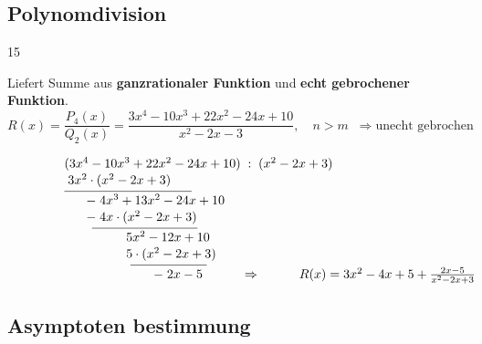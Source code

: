 \subsection{Polynomdivision }{15}

Liefert Summe aus \textbf{ganzrationaler Funktion} und \textbf{echt gebrochener Funktion}.
\[
R(x) = \frac{P_4(x)}{Q_2(x)} = \frac{3x^4 - 10x^3 + 22x^2 - 24x + 10}{x^2 - 2x - 3}, \quad n > m \;\; \Rightarrow \text{unecht gebrochen}
\]

\[
\makebox[270pt][l]{%
\begin{tabular}{@{}l@{}}
$(3x^4 - 10x^3 + 22x^2 - 24x + 10) \; : \; (x^2 - 2x + 3)$ \\[1pt]

$\;3x^2 \cdot (x^2 - 2x + 3)$ \\[-6pt]
\rule{3.5cm}{0.4pt} \\[-2pt]

\hspace*{0.6cm}$-\;4x^3 + 13x^2 - 24x + 10$ \\[1pt]

\hspace*{0.6cm}$-\; 4x \cdot (x^2 - 2x + 3)$ \\[-6pt]
\quad \quad \,\rule{2.9cm}{0.4pt} \\[-2pt]

\hspace*{1.7cm}$5x^2 - 12x + 10$ \\[1pt]

\hspace*{1.7cm}$5 \cdot (x^2 - 2x + 3)$ \\[-6pt]
\quad \quad \quad \quad \quad \,\rule{2.1cm}{0.4pt} \\[-2pt]

\hspace*{2.45cm}$-\;2x - 5 \quad \quad \quad\Rightarrow \quad \quad \quad R(x) = 3x^2 - 4x + 5 + \frac{2x - 5}{x^2 - 2x + 3}$ \\[1pt]
\end{tabular}}
\]

\subsection{Asymptoten bestimmung}

